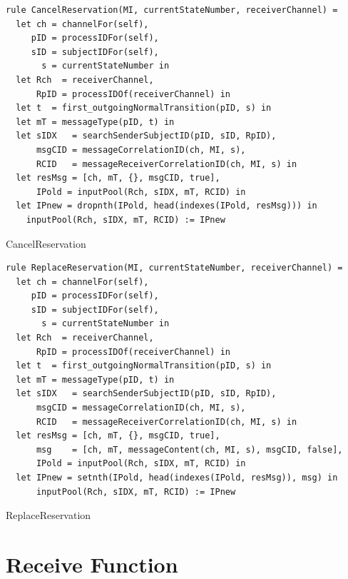 \begin{listing}[H]
\begin{verbatim}
rule CancelReservation(MI, currentStateNumber, receiverChannel) =
  let ch = channelFor(self),
     pID = processIDFor(self),
     sID = subjectIDFor(self),
       s = currentStateNumber in
  let Rch  = receiverChannel,
      RpID = processIDOf(receiverChannel) in
  let t  = first_outgoingNormalTransition(pID, s) in
  let mT = messageType(pID, t) in
  let sIDX   = searchSenderSubjectID(pID, sID, RpID),
      msgCID = messageCorrelationID(ch, MI, s),
      RCID   = messageReceiverCorrelationID(ch, MI, s) in
  let resMsg = [ch, mT, {}, msgCID, true],
      IPold = inputPool(Rch, sIDX, mT, RCID) in
  let IPnew = dropnth(IPold, head(indexes(IPold, resMsg))) in
    inputPool(Rch, sIDX, mT, RCID) := IPnew
\end{verbatim}
\caption{CancelReservation}
\label{lst:asm:CancelReservation}
\end{listing}




\begin{listing}[H]
\begin{verbatim}
rule ReplaceReservation(MI, currentStateNumber, receiverChannel) =
  let ch = channelFor(self),
     pID = processIDFor(self),
     sID = subjectIDFor(self),
       s = currentStateNumber in
  let Rch  = receiverChannel,
      RpID = processIDOf(receiverChannel) in
  let t  = first_outgoingNormalTransition(pID, s) in
  let mT = messageType(pID, t) in
  let sIDX   = searchSenderSubjectID(pID, sID, RpID),
      msgCID = messageCorrelationID(ch, MI, s),
      RCID   = messageReceiverCorrelationID(ch, MI, s) in
  let resMsg = [ch, mT, {}, msgCID, true],
      msg    = [ch, mT, messageContent(ch, MI, s), msgCID, false],
      IPold = inputPool(Rch, sIDX, mT, RCID) in
  let IPnew = setnth(IPold, head(indexes(IPold, resMsg)), msg) in
      inputPool(Rch, sIDX, mT, RCID) := IPnew
\end{verbatim}
\caption{ReplaceReservation}
\label{lst:asm:ReplaceReservation}
\end{listing}



\section{Receive Function}


